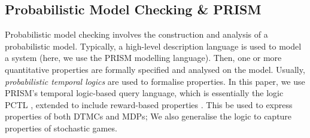 \documentclass{llncs}
\begin{document}
\subsection{Probabilistic Model Checking \& PRISM}

Probabilistic model checking involves the construction and analysis of a probabilistic model.
Typically, a high-level description language is used to model a system
(here, we use the PRISM \cite{KNP11} modelling language).
Then, one or more quantitative properties are formally specified and analysed on the model.
Usually, \emph{probabilistic temporal logics} are used to formalise properties.
In this paper, we use PRISM's temporal logic-based query language,
which is essentially the logic PCTL \cite{HJ94},
extended to include reward-based properties \cite{KNP07a,FKNP11}.
This be used to express properties of both DTMCs and MDPs;
We also generalise the logic to capture properties of stochastic games.
\end{document}
